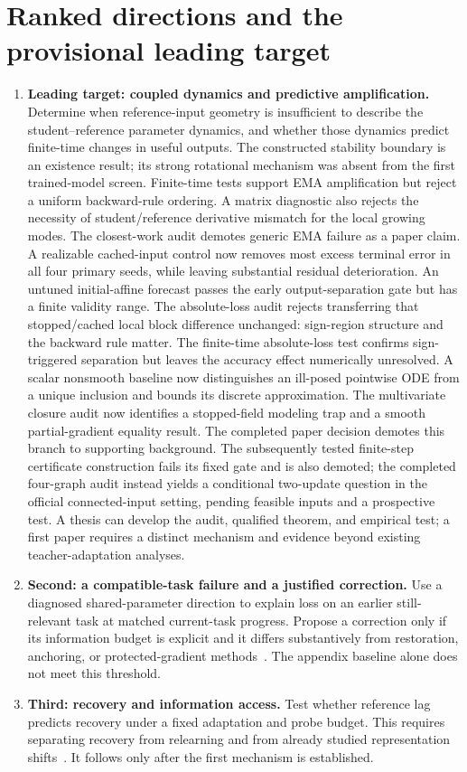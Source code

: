 \documentclass[11pt,a4paper]{article}
\begin{document}
\section{Ranked directions and the provisional leading target}
\begin{enumerate}[leftmargin=*]
\item \textbf{Leading target: coupled dynamics and predictive amplification.}
Determine when reference-input geometry is insufficient to describe the
student--reference parameter dynamics, and whether those dynamics predict
finite-time changes in useful outputs. The constructed stability boundary
is an existence result; its strong rotational mechanism was absent from
the first trained-model screen. Finite-time tests support EMA amplification
but reject a uniform backward-rule ordering. A matrix diagnostic also
rejects the necessity of student/reference derivative mismatch for the
local growing modes. The closest-work audit demotes generic EMA failure
as a paper claim. A realizable cached-input control now removes most
excess terminal error in all four primary seeds, while leaving substantial
residual deterioration. An untuned initial-affine forecast passes the
early output-separation gate but has a finite validity range. The
absolute-loss audit rejects transferring that stopped/cached local block
difference unchanged: sign-region structure and the backward rule matter.
The finite-time absolute-loss test confirms sign-triggered separation
but leaves the accuracy effect numerically unresolved. A scalar
nonsmooth baseline now distinguishes an ill-posed pointwise ODE from a
unique inclusion and bounds its discrete approximation. The multivariate
closure audit now identifies a stopped-field modeling trap and a smooth
partial-gradient equality result. The completed paper decision demotes
this branch to supporting background. The subsequently tested finite-step
certificate construction fails its fixed gate and is also demoted; the
completed four-graph audit instead yields a conditional two-update
question in the official connected-input setting, pending feasible inputs
and a prospective test. A thesis can develop the audit, qualified theorem, and empirical
test; a first paper requires a distinct mechanism and evidence beyond
existing teacher-adaptation analyses.
\item \textbf{Second: a compatible-task failure and a justified correction.}
Use a diagnosed shared-parameter direction to explain loss on an earlier
still-relevant task at matched current-task progress. Propose a correction
only if its information budget is explicit and it differs substantively
from restoration, anchoring, or protected-gradient methods~\cite{ogd}.
The appendix baseline alone does not meet this threshold.
\item \textbf{Third: recovery and information access.}
Test whether reference lag predicts recovery under a fixed adaptation and
probe budget. This requires separating recovery from relearning and from
already studied representation shifts~\cite{spurious}. It follows only
after the first mechanism is established.
\end{enumerate}
\end{document}
